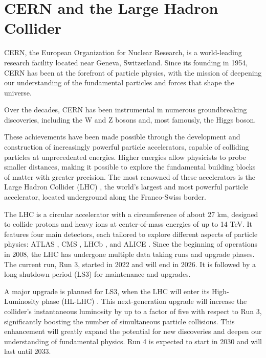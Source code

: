 \section{CERN and the Large Hadron Collider}

CERN, the European Organization for Nuclear Research, is a world-leading research facility located near Geneva, Switzerland. Since its founding in 1954, CERN has been at the forefront of particle physics, with the mission of deepening our understanding of the fundamental particles and forces that shape the universe.

Over the decades, CERN has been instrumental in numerous groundbreaking discoveries, including the W and Z bosons and, most famously, the Higgs boson.

These achievements have been made possible through the development and construction of increasingly powerful particle accelerators, capable of colliding particles at unprecedented energies. Higher energies allow physicists to probe smaller distances, making it possible to explore the fundamental building blocks of matter with greater precision. The most renowned of these accelerators is the Large Hadron Collider (LHC) \cite{lhc-tdr}, the world's largest and most powerful particle accelerator, located underground along the Franco-Swiss border.

The LHC is a circular accelerator with a circumference of about 27 km, designed to collide protons and heavy ions at center-of-mass energies of up to 14 TeV. It features four main detectors, each tailored to explore different aspects of particle physics: ATLAS \cite{atlas}, CMS \cite{cms}, LHCb \cite{lhcb}, and ALICE \cite{alice}. Since the beginning of operations in 2008, the LHC has undergone multiple data taking runs and upgrade phases. The current run, Run 3, started in 2022 and will end in 2026. It is followed by a long shutdown period (LS3) for maintenance and upgrades.


A major upgrade is planned for LS3, when the LHC will enter its High-Luminosity phase (HL-LHC) \cite{hl-lhc-tdr}. This next-generation upgrade will increase the collider's instantaneous luminosity by up to a factor of five with respect to Run 3, significantly boosting the number of simultaneous particle collisions. This enhancement will greatly expand the potential for new discoveries and deepen our understanding of fundamental physics. Run 4 is expected to start in 2030 and will last until 2033.

